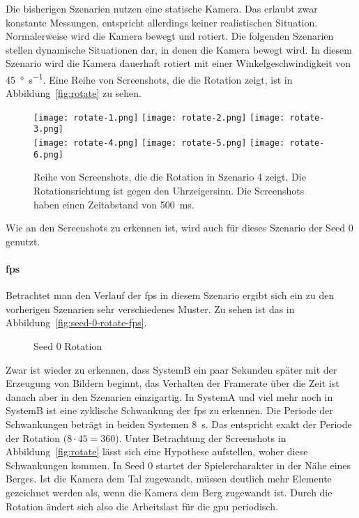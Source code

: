 Die bisherigen Szenarien nutzen eine statische Kamera. Das erlaubt zwar konstante Messungen, entspricht allerdings keiner realistischen Situation. Normalerweise wird die Kamera bewegt und rotiert. Die folgenden Szenarien stellen dynamische Situationen dar, in denen die Kamera bewegt wird. In diesem Szenario wird die Kamera dauerhaft rotiert mit einer Winkelgeschwindigkeit von \SI{45}{\degree\per\second}. Eine Reihe von Screenshots, die die Rotation zeigt, ist in Abbildung~\vref{fig:rotate} zu sehen.
\begin{figure}
	\centering
	\texttt{[image: rotate-1.png]}
	\texttt{[image: rotate-2.png]}
	\texttt{[image: rotate-3.png]}\\[4pt]
	\texttt{[image: rotate-4.png]}
	\texttt{[image: rotate-5.png]}
	\texttt{[image: rotate-6.png]}
	\caption{Reihe von Screenshots, die die Rotation in Szenario 4 zeigt. Die Rotationsrichtung ist gegen den Uhrzeigersinn. Die Screenshots haben einen Zeitabstand von \SI{500}{\milli\second}.}\label{fig:rotate}
\end{figure}
Wie an den Screenshots zu erkennen ist, wird auch für dieses Szenario der Seed 0 genutzt.

\paragraph{\ac{fps}}
Betrachtet man den Verlauf der \ac{fps} in diesem Szenario ergibt sich ein zu den vorherigen Szenarien sehr verschiedenes Muster. Zu sehen ist das in Abbildung~\vref{fig:seed-0-rotate-fps}.
\begin{figure}[!htbp]
	\caption{Seed 0 Rotation}\label{fig:seed-0-rotate-fps}
\end{figure}
 Zwar ist wieder zu erkennen, dass SystemB ein paar Sekunden später mit der Erzeugung von Bildern beginnt, das Verhalten der Framerate über die Zeit ist danach aber in den Szenarien einzigartig. In SystemA und viel mehr noch in SystemB ist eine zyklische Schwankung der \ac{fps} zu erkennen. Die Periode der Schwankungen beträgt in beiden Systemen \SI{8}{\second}. Das entspricht exakt der Periode der Rotation ($8\cdot45 = 360$). Unter Betrachtung der Screenshots in Abbildung~\vref{fig:rotate} lässt sich eine Hypothese aufstellen, woher diese Schwankungen kommen. In Seed 0 startet der Spielercharakter in der Nähe eines Berges. Ist die Kamera dem Tal zugewandt, müssen deutlich mehr Elemente gezeichnet werden als, wenn die Kamera dem Berg zugewandt ist. Durch die Rotation ändert sich also die Arbeitslast für die \ac{gpu} periodisch.

